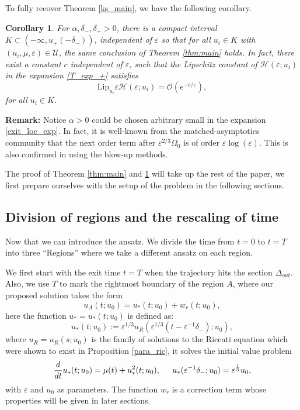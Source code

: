 \documentclass[letterpaper,11pt]{article}
\newcommand{\rmO}{\mathcal{O}}
\newcommand{\eps}{\varepsilon}
\numberwithin{equation}{section}
\theoremstyle{plain}
\newtheorem{Corollary}[Lemma]{Corollary}
\begin{document}
To fully recover Theorem \ref{ks_main}, we have the following corollary.
\begin{Corollary}\label{cor:main}
For $\alpha,\delta_-,\delta_+>0$, there is a compact interval $K \subset (-\infty, u_+(-\delta_-))$, independent of $\eps$ so that for all $u_i \in K$ with $(u_i,\mu,\eps) \in \mathcal{U}$, the same conclusion of Theorem \ref{thm:main} holds. In fact, there exist a constant $c$ independent of $\eps$, such that the Lipschitz constant of $\mathcal{H}(\eps;u_i)$ in the expansion \eqref{T_exp_+} satisfies
\begin{equation}\label{T_remainder_exp_+}
\text{Lip}_{u_i} \eps\mathcal{H}(\eps;u_i) = \rmO(e^{-c/\eps}),
\end{equation}
for all $u_i \in K$.
\end{Corollary}



\textbf{Remark:} Notice $\alpha>0$ could be chosen arbitrary small in the expansion \eqref{exit_loc_exp}. In fact, it is well-known from the matched-asymptotics community that the next order term after $\eps^{2/3}\Omega_0$ is of order $\eps \log(\eps)$.  This is also confirmed in \citep{KrupaSz} using the blow-up methods. 


 The proof of Theorem \ref{thm:main} and \ref{cor:main} will take up the rest of the paper,  we first prepare ourselves with the setup of the problem in the following sections.

\subsection{Division of regions and the rescaling of time}\label{t_sigma}
Now that we can introduce the ansatz. We divide the time from $t=0$ to $t=T$ into three ``Regions'' where we take a different ansatz on each region. 

We first start with the exit time $t=T$ when the trajectory hits the section $\Delta_{out}$. Also, we use $T$ to mark the rightmost boundary of the region $A$, where our proposed solution takes the form
\[
u_A(t; u_0) = u_*(t;u_0)  + w_r(t;u_0),
\]
here the function $u_* = u_*(t; u_0)$ is defined as:
\begin{equation}\label{urdef}
u_*(t; u_0) := \eps^{1/3}u_R(\eps^{1/3}(t-\eps^{-1}\delta_-); u_0),
\end{equation}
where $u_R=u_R(s; u_0)$ is the family of solutions to the Riccati equation which were shown to exist in Proposition \ref{para_ric}, it solves the initial value problem
\begin{equation}\label{ureq}
\frac{d}{dt}u_*(t; u_0) = \mu(t) + u_*^2(t; u_0), \hspace{0.2in} u_*(\eps^{-1}\delta_-; u_0) = \eps^{\frac{1}{3}} u_0,
\end{equation}
with $\eps$ and $u_0$ as parameters.  The function $w_r$ is a correction term whose properties will be given in later sections. 
\end{document}
